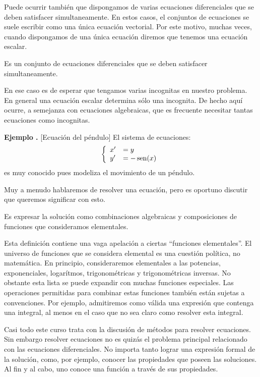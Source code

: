 \documentclass{article}
\renewcommand{\emph}[1]{\textcolor[rgb]{1,0,0}{#1}}
\DeclareMathOperator{\sen}{sen}
\newcounter{ejemplo_cont}
\newenvironment{ejemplo}{\noindent\textbf{Ejemplo  \arabic{ejemplo_cont}.} }{\addtocounter{ejemplo_cont}{1}}
\begin{document}
Puede ocurrir también que dispongamos de varias ecuaciones diferenciales que se deben satisfacer simultaneamente. En estos casos, el conjuntos de ecuaciones se suele escribir como una única ecuación vectorial. Por este motivo, muchas veces, cuando dispongamos de una única ecuación diremos que tenemos una \emph{ecuación  escalar}.

\begin{definicion} Es un  conjunto de ecuaciones diferenciales que se deben satisfacer simultaneamente.
 \end{definicion}

En ese caso es  de esperar que tengamos varias incognitas en
nuestro problema. En general una ecuación escalar determina sólo una incognita. De hecho aquí ocurre, a semejanza con ecuaciones algebraicas, que es frecuente necesitar tantas ecuaciones como incognitas.

\begin{ejemplo}[Ecuación del péndulo] El sistema de ecuaciones:
\[\left\{ \begin{array}{l l} x'&=y \\y'&=-\sen(x) \end{array}\right.\]
es muy conocido pues modeliza el movimiento de un péndulo.
\end{ejemplo}



Muy a menudo hablaremos de resolver una ecuación, pero es oportuno discutir que queremos significar con esto.

\begin{definicion} Es expresar la solución como combinaciones algebraicas y composiciones de funciones que consideramos elementales.
\end{definicion}

Esta definición contiene una vaga apelación a ciertas ``funciones elementales''. El universo de funciones que se considera elemental es una cuestión política, no matemática. En  principio, consideraremos elementales a las potencias, exponenciales, logarítmos, trigonométricas y trigonométricas inversas. No obstante esta lista se puede expandir con muchas funciones especiales.  Las operaciones permitidas para combinar estas funciones
también están sujetas a convenciones. Por ejemplo, admitiremos como válida una expresión que contenga una integral, al menos en el caso que no sea claro como resolver esta integral.

 Casi todo este curso trata con la discusión de métodos para resolver ecuaciones.  Sin embargo resolver ecuaciones no es quizás el problema principal relacionado con las ecuaciones diferenciales. No importa tanto lograr una expresión formal de la solución, como, por ejemplo, conocer las propiedades que poseen las soluciones. Al fin y al cabo, uno conoce una función a través de sus propiedades.
 
\end{document}
